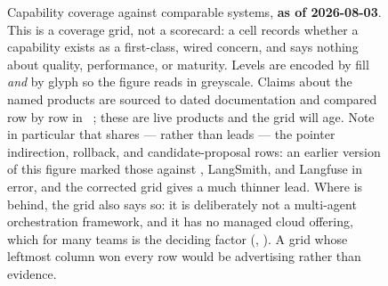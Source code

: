 \begin{figure}[tbp]
\begin{cbwide}
\begin{tikzpicture}[x=1cm,y=1cm]
\end{tikzpicture}
\end{cbwide}
\caption{Capability coverage against comparable systems, \textbf{as of
2026-08-03}. This is a coverage grid, not a scorecard: a cell records whether a
capability exists as a first-class, wired concern, and says nothing about quality,
performance, or maturity. Levels are encoded by fill \emph{and} by glyph so the
figure reads in greyscale. Claims about the named products are sourced to dated
documentation and compared row by row in
~\cite{mlflowpromptregistry,mlflowoptimize,
langsmithprompts,langfuseprompts}; these are live products and the grid will age.
Note in particular that \sys shares --- rather than leads --- the pointer
indirection, rollback, and candidate-proposal rows: an earlier version of this
figure marked those against \mlflow{}, LangSmith, and Langfuse in error, and the
corrected grid gives \sys a much thinner lead. Where \sys is behind, the grid
also says so: it is deliberately not a multi-agent orchestration framework, and it
has no managed cloud offering, which for many teams is the deciding factor
(, ). A grid whose leftmost column
won every row would be advertising rather than evidence.}
\label{fig:capability}
\end{figure}
